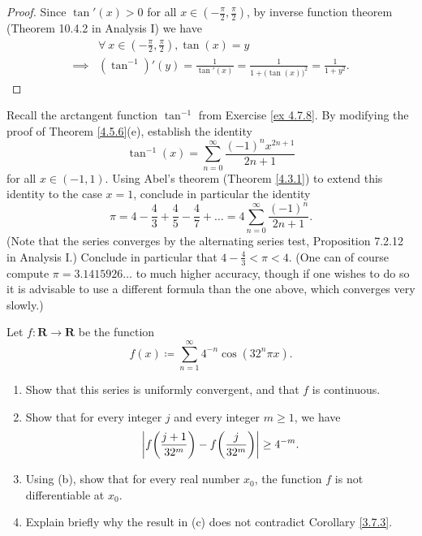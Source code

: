 \begin{proof}
    Since \(\tan'(x) > 0\) for all \(x \in (-\frac{\pi}{2}, \frac{\pi}{2})\), by inverse function theorem (Theorem 10.4.2 in Analysis I) we have
    \begin{align*}
                 & \forall\ x \in (-\frac{\pi}{2}, \frac{\pi}{2}), \tan(x) = y                                   \\
        \implies & (\tan^{-1})'(y) = \frac{1}{\tan'(x)} = \frac{1}{1 + \big(\tan(x)\big)^2} = \frac{1}{1 + y^2}.
    \end{align*}
\end{proof}

\begin{exercise}\label{ex 4.7.9}
    Recall the arctangent function \(\tan^{-1}\) from Exercise \ref{ex 4.7.8}.
    By modifying the proof of Theorem \ref{4.5.6}(e), establish the identity
    \[
        \tan^{-1}(x) = \sum_{n = 0}^\infty \frac{(-1)^n x^{2n + 1}}{2n + 1}
    \]
    for all \(x \in (-1, 1)\).
    Using Abel's theorem (Theorem \ref{4.3.1}) to extend this identity to the case \(x = 1\), conclude in particular the identity
    \[
        \pi = 4 - \frac{4}{3} + \frac{4}{5} - \frac{4}{7} + \dots = 4 \sum_{n = 0}^\infty \frac{(-1)^n}{2n + 1}.
    \]
    (Note that the series converges by the alternating series test, Proposition 7.2.12 in Analysis I.)
    Conclude in particular that \(4 - \frac{4}{3} < \pi < 4\).
    (One can of course compute \(\pi = 3.1415926 \dots\) to much higher accuracy, though if one wishes to do so it is advisable to use a different formula than the one above, which converges very slowly.)
\end{exercise}

\begin{exercise}\label{ex 4.7.10}
    Let \(f : \mathbf{R} \to \mathbf{R}\) be the function
    \[
        f(x) \coloneqq \sum_{n = 1}^\infty 4^{-n} \cos(32^n \pi x).
    \]
    \begin{enumerate}
        \item Show that this series is uniformly convergent, and that \(f\) is continuous.
        \item Show that for every integer \(j\) and every integer \(m \geq 1\), we have
              \[
                  \abs*{f\bigg(\frac{j + 1}{32^m}\bigg) - f\bigg(\frac{j}{32^m}\bigg)} \geq 4^{-m}.
              \]
        \item Using (b), show that for every real number \(x_0\), the function \(f\) is not differentiable at \(x_0\).
        \item Explain briefly why the result in (c) does not contradict Corollary \ref{3.7.3}.
    \end{enumerate}
\end{exercise}
